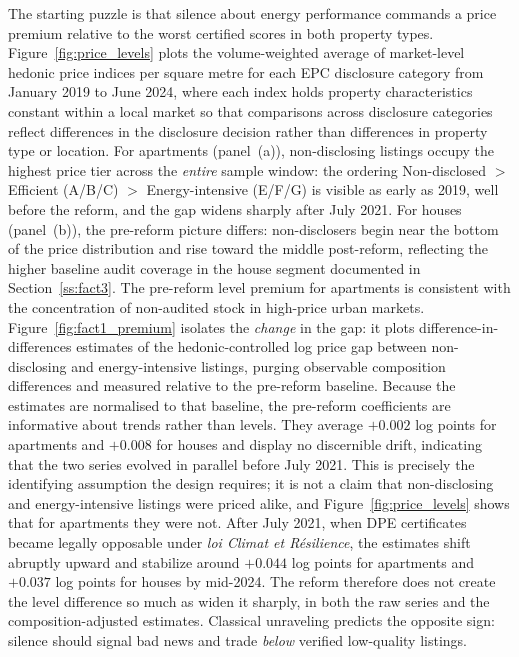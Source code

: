 The starting puzzle is that silence about energy performance commands a price premium relative to the worst certified scores in both property types. Figure~\ref{fig:price_levels} plots the volume-weighted average of market-level hedonic price indices per square metre for each EPC disclosure category from January 2019 to June 2024, where each index holds property characteristics constant within a local market so that comparisons across disclosure categories reflect differences in the disclosure decision rather than differences in property type or location. For apartments (panel~(a)), non-disclosing listings occupy the highest price tier across the \emph{entire} sample window: the ordering Non-disclosed $>$ Efficient (A/B/C) $>$ Energy-intensive (E/F/G) is visible as early as 2019, well before the reform, and the gap widens sharply after July 2021. For houses (panel~(b)), the pre-reform picture differs: non-disclosers begin near the bottom of the price distribution and rise toward the middle post-reform, reflecting the higher baseline audit coverage in the house segment documented in Section~\ref{ss:fact3}. The pre-reform level premium for apartments is consistent with the concentration of non-audited stock in high-price urban markets. Figure~\ref{fig:fact1_premium} isolates the \emph{change} in the gap: it plots difference-in-differences estimates of the hedonic-controlled log price gap between non-disclosing and energy-intensive listings, purging observable composition differences and measured relative to the pre-reform baseline. Because the estimates are normalised to that baseline, the pre-reform coefficients are informative about trends rather than levels. They average $+0.002$ log points for apartments and $+0.008$ for houses and display no discernible drift, indicating that the two series evolved in parallel before July 2021. This is precisely the identifying assumption the design requires; it is not a claim that non-disclosing and energy-intensive listings were priced alike, and Figure~\ref{fig:price_levels} shows that for apartments they were not. After July 2021, when DPE certificates became legally opposable under \emph{loi Climat et R\'esilience}, the estimates shift abruptly upward and stabilize around $+0.044$ log points for apartments and $+0.037$ log points for houses by mid-2024. The reform therefore does not create the level difference so much as widen it sharply, in both the raw series and the composition-adjusted estimates. Classical unraveling predicts the opposite sign: silence should signal bad news and trade \emph{below} verified low-quality listings.

